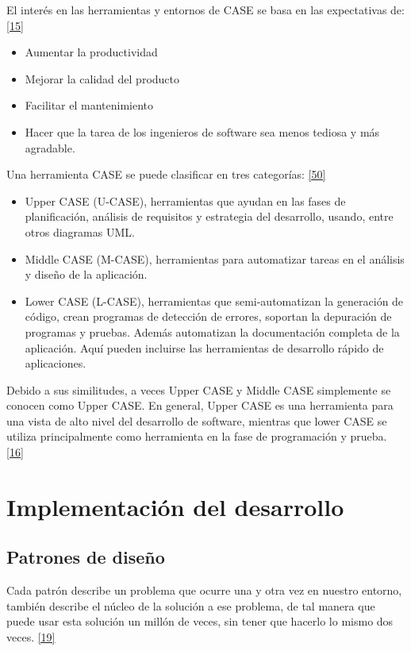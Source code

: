 El interés en las herramientas y entornos de CASE se basa en las expectativas de: \hyperlink{b15}{[15]}
\begin{itemize}
	\item Aumentar la productividad
	\item Mejorar la calidad del producto
	\item Facilitar el mantenimiento
	\item Hacer que la tarea de los ingenieros de software sea menos tediosa y más agradable. 
\end{itemize}

Una herramienta CASE se puede clasificar en tres categorías: \hyperlink{b50}{[50]}

\begin{itemize}
	\item Upper CASE (U-CASE), herramientas que ayudan en las fases de planificación, análisis de requisitos y estrategia del desarrollo, usando, entre otros diagramas UML.
	\item Middle CASE (M-CASE), herramientas para automatizar tareas en el análisis y diseño de la aplicación.
	\item Lower CASE (L-CASE), herramientas que semi-automatizan la generación de código, crean programas de detección de errores, soportan la depuración de programas y pruebas. Además automatizan la documentación completa de la aplicación. Aquí pueden incluirse las herramientas de desarrollo rápido de aplicaciones.
\end{itemize}

Debido a sus similitudes, a veces Upper CASE y Middle CASE simplemente se conocen como Upper CASE. En general, Upper CASE es una herramienta para una vista de alto nivel del desarrollo de software, mientras que lower CASE se utiliza principalmente como herramienta en la fase de programación y prueba. \hyperlink{b16}{[16]}

\section {Implementación del desarrollo}

\subsection{Patrones de diseño}

Cada patrón describe un problema que ocurre una y otra vez en nuestro entorno, también describe el núcleo de la solución a ese problema, de tal manera que puede usar esta solución un millón de veces, sin tener que hacerlo lo mismo dos veces. \hyperlink{b19}{[19]} \\

